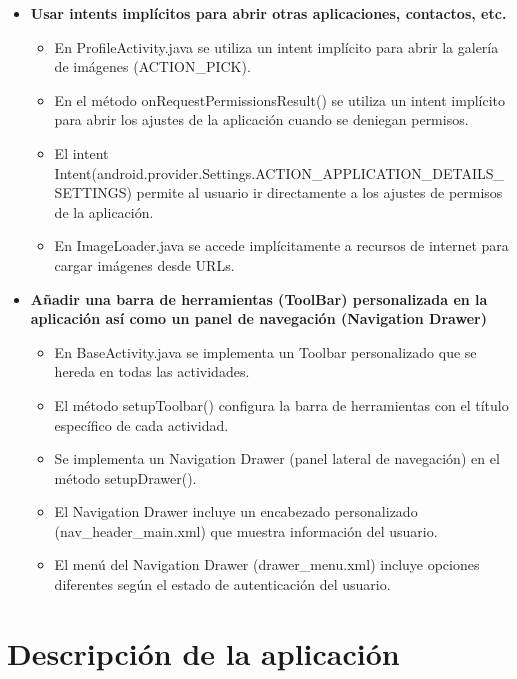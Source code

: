 \documentclass[a4paper,10pt]{report}
\begin{document}
\begin{itemize}
        \item \textbf{Usar intents implícitos para abrir otras aplicaciones, contactos, etc.}
        \begin{itemize}
          \item En ProfileActivity.java se utiliza un intent implícito para abrir la galería de imágenes (ACTION\_PICK).
          \item En el método onRequestPermissionsResult() se utiliza un intent implícito para abrir los ajustes de la aplicación cuando se deniegan permisos.
          \item El intent Intent(android.provider.Settings.ACTION\_APPLICATION\_DETAILS\_SETTINGS) permite al usuario ir directamente a los ajustes de permisos de la aplicación.
          \item En ImageLoader.java se accede implícitamente a recursos de internet para cargar imágenes desde URLs.
        \end{itemize}
        \item \textbf{Añadir una barra de herramientas (ToolBar) personalizada en la aplicación así como un panel de navegación (Navigation Drawer)}
        \begin{itemize}
          \item En BaseActivity.java se implementa un Toolbar personalizado que se hereda en todas las actividades.
          \item El método setupToolbar() configura la barra de herramientas con el título específico de cada actividad.
          \item Se implementa un Navigation Drawer (panel lateral de navegación) en el método setupDrawer().
          \item El Navigation Drawer incluye un encabezado personalizado (nav\_header\_main.xml) que muestra información del usuario.
          \item El menú del Navigation Drawer (drawer\_menu.xml) incluye opciones diferentes según el estado de autenticación del usuario.
        \end{itemize}
      \end{itemize}
  \chapter{Descripción de la aplicación}
\end{document}
